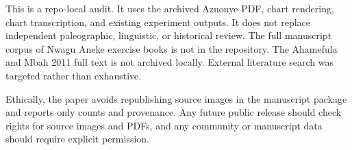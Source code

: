 This is a repo-local audit. It uses the archived Azuonye PDF, chart rendering, chart transcription, and existing experiment outputs. It does not replace independent paleographic, linguistic, or historical review. The full manuscript corpus of Nwagu Aneke exercise books is not in the repository. The Ahamefula and Mbah 2011 full text is not archived locally. External literature search was targeted rather than exhaustive.

Ethically, the paper avoids republishing source images in the manuscript package and reports only counts and provenance. Any future public release should check rights for source images and PDFs, and any community or manuscript data should require explicit permission.
